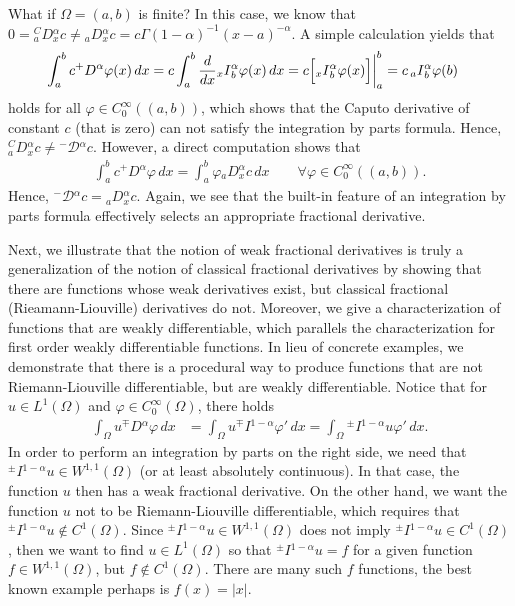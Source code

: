 \documentclass[leqno,final]{siamltex}
\numberwithin{equation}{section}
\renewcommand{\(}{\bigl(}
\renewcommand{\)}{\bigr)}
\begin{document}
    What if $\Omega = (a,b)$ is finite? In this case, we know that $0={^{C}_{a}}{D}{^{\alpha}_{x}} c \neq {_{a}}{D}{^{\alpha}_{x}} c 
    = c \Gamma(1-\alpha)^{-1} (x-a)^{-\alpha}$. 
    A simple calculation yields that 
    \begin{align*}
        \int_{a}^{b} c {^{+}}{D}{^{\alpha}}\varphi(x)\, dx &= c\int_{a}^{b}  \dfrac{d}{dx} {_{x}}{I}{^{\alpha}_{b}} \varphi(x)\,dx = c \Bigl[ {_{x}}{I}{^{\alpha}_{b}} \varphi(x) \Bigr] \bigg|_{a}^{b} = c\, {_{a}}{I}{^{\alpha}_{b}}\varphi(b)
    \end{align*}
     holds for all $\varphi \in C^{\infty}_{0}((a,b))$, which shows that the Caputo 
     derivative of constant $c$ (that is zero) can not satisfy the integration by parts 
     formula. Hence, 
     $ {^{C}_{a}}{{D}}{_{x}^{\alpha}} c\neq {^{-}}{\mathcal{D}}{^{\alpha}} c$.  
     However, a direct computation shows that 
    \begin{align*}
        \int_{a}^{b} c {^{+}}{D}{^{\alpha}}\varphi\,dx  = \int_{a}^{b} \varphi  {_{a}}{D}{^{\alpha}
        _{x}} c\,dx  \qquad \forall \varphi \in C^{\infty}_{0}((a,b)).
    \end{align*}
    Hence, ${^{-}}{\mathcal{D}}{^{\alpha}} c = {_{a}}{D}{^{\alpha}_x} c$. Again, we see that 
    the built-in feature of an integration by parts formula effectively selects an appropriate fractional derivative.

    
    Next, we illustrate that the notion of weak fractional derivatives is truly a generalization 
    of the notion of classical fractional derivatives by showing that there are functions whose
    weak derivatives exist, but classical fractional (Rieamann-Liouville) derivatives do not. 
    Moreover, we give a characterization of functions that are weakly differentiable, which parallels the characterization for first order weakly differentiable functions.
   In lieu of concrete examples, we demonstrate that there is a procedural way to produce 
   functions that are not Riemann-Liouville differentiable, but are weakly differentiable. 
   Notice that for $u \in L^{1}(\Omega)$ and $\varphi \in C^{\infty}_{0}(\Omega)$, there holds
    \begin{align*}
        \int_{\Omega} u {^{\mp}}{D}{^{\alpha}} \varphi\,dx &= \int_{\Omega} u {^{\mp}}{I}{^{1-\alpha}} \varphi'\,dx = \int_{\Omega} {^{\pm}}{I}{^{1-\alpha}} u \varphi '\,dx.
    \end{align*}
    In order to perform an integration by parts on the right side, we need that ${^{\pm}}{I}{^{1-\alpha}}u\in W^{1,1}(\Omega)$ (or at least absolutely continuous).
    In that case, the function $u$ then has a weak fractional derivative. On the other hand,
     we want the function 
    $u$ not to be Riemann-Liouville differentiable, which requires that ${^{\pm}}{I}{^{1-\alpha}} u \not \in C^{1}(\Omega)$. Since ${^{\pm}}{I}{^{1-\alpha}}u \in W^{1,1}(\Omega)$ does not imply ${^{\pm}}{I}{^{1-\alpha}}u \in C^{1}(\Omega) $, then we want to find $u \in L^{1}(\Omega)$ so that ${^{\pm}}{I}{^{1-\alpha}} u = f$ 
    for a given function $f \in W^{1,1}(\Omega)$, but $f \not\in C^{1}(\Omega)$. There are many such $f$ functions, the best known example perhaps is $f(x) = |x|$. 
 
\end{document}
